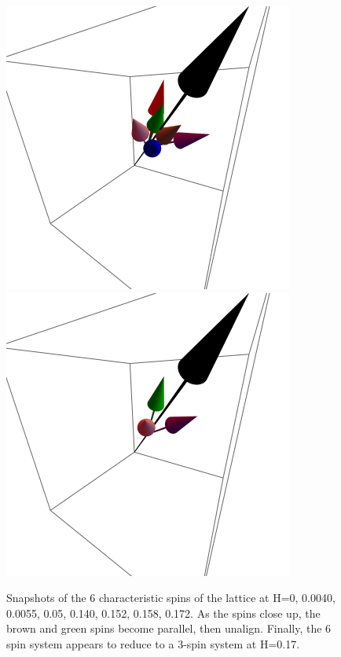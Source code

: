 \documentclass{article}
\begin{document}
\begin{figure}[ht]
\includegraphics[scale=0.3]{HVariedData/Pictures/111Inc55S.png}
\includegraphics[scale=0.3]{HVariedData/Pictures/111Inc62S.png}
\caption{Snapshots of the 6 characteristic spins of the lattice at H=0, 0.0040, 0.0055, 0.05, 0.140, 0.152, 0.158, 0.172.
As the spins close up, the brown and green spins become parallel, then unalign. Finally, the 6 spin system appears
to reduce to a 3-spin system at H=0.17.}
\end{figure}
\clearpage
\end{document}
